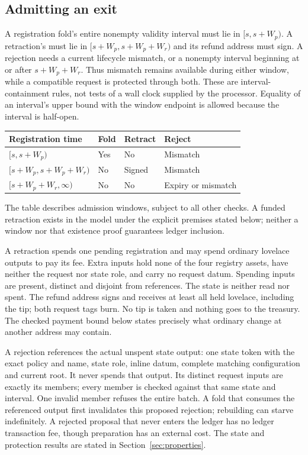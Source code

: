 \subsection{Admitting an exit}
A registration fold's entire nonempty validity interval must lie in
$[s,s+W_p)$. A retraction's must lie in $[s+W_p,s+W_p+W_r)$ and its refund
address must sign. A rejection needs a current lifecycle mismatch, or a
nonempty interval beginning at or after $s+W_p+W_r$. Thus mismatch remains
available during either window, while a compatible request is protected
through both. These are interval-containment rules, not tests of a wall clock
supplied by the processor. Equality of an interval's upper bound with the
window endpoint is allowed because the interval is half-open.

\begin{center}\small
\begin{tabular}{llll}\toprule
Registration time & Fold & Retract & Reject\\\midrule
$[s,s+W_p)$ & Yes & No & Mismatch\\
$[s+W_p,s+W_p+W_r)$ & No & Signed & Mismatch\\
$[s+W_p+W_r,\infty)$ & No & No & Expiry or mismatch\\\bottomrule
\end{tabular}
\end{center}
The table describes admission windows, subject to all other checks. A funded
retraction exists in the model under the explicit premises stated below;
neither a window nor that existence proof guarantees ledger inclusion.

A retraction spends one pending registration and may spend ordinary lovelace
outputs to pay its fee. Extra inputs hold none of the four registry assets,
have neither the request nor state role, and carry no request datum. Spending
inputs are present, distinct and disjoint from references. The state is neither
read nor spent. The refund address signs and receives at least all held
lovelace, including the tip; both request tags burn. No tip is taken and
nothing goes to the treasury. The checked payment bound below states precisely
what ordinary change at another address may contain.

A rejection references the actual unspent state output: one state token with
the exact policy and name, state role, inline datum, complete matching
configuration and current root. It never spends that output. Its distinct
request inputs are exactly its members; every member is checked against that
same state and interval. One invalid member refuses the entire batch. A fold
that consumes the referenced output first invalidates this proposed rejection;
rebuilding can starve indefinitely. A rejected proposal that never enters the
ledger has no ledger transaction fee, though preparation has an external cost.
The state and protection results are stated in Section~\ref{sec:properties}.

